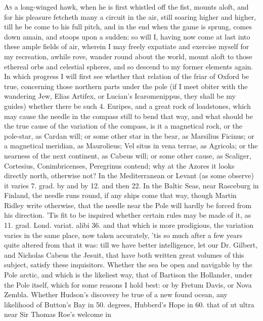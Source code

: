 {\lettrine{A}{s} a long-winged hawk, when he is first whistled off the fist, mounts
aloft, and for his pleasure fetcheth many a circuit in the air, still
soaring higher and higher, till he be come to his full pitch, and in
the end when the game is sprung, comes down amain, and stoops upon a
sudden: so will I, having now come at last into these ample fields of
air, wherein I may freely expatiate and exercise myself for my
recreation, awhile rove, wander round about the world, mount aloft to
those ethereal orbs and celestial spheres, and so descend to my former
elements again. In which progress I will first see whether that
relation of the friar of  Oxford be true, concerning those
northern parts under the pole (if I meet obiter with the wandering Jew,
Elias Artifex, or Lucian's Icaromenippus, they shall be my guides)
whether there be such 4. Euripes, and a great rock of loadstones, which
may cause the needle in the compass still to bend that way, and what
should be the true cause of the variation of the compass, is it a
magnetical rock, or the pole-star, as Cardan will; or some other star
in the bear, as Marsilius Ficinus; or a magnetical meridian, as
Maurolieus; Vel situs in vena terrae, as Agricola; or the nearness of
the next continent, as Cabeus will; or some other cause, as Scaliger,
Cortesius, Conimbricenses, Peregrinus contend; why at the Azores it
looks directly north, otherwise not? In the Mediterranean or Levant (as
some observe) it varies 7. grad. by and by 12. and then 22. In the
Baltic Seas, near Rasceburg in Finland, the needle runs round, if any
ships come that way, though Martin Ridley write otherwise, that
the needle near the Pole will hardly be forced from his direction. 'Tis
fit to be inquired whether certain rules may be made of it, as 11.
grad. Lond. variat. alibi 36. \etc{} and that which is more prodigious,
the variation varies in the same place, now taken accurately, 'tis so
much after a few years quite altered from that it was: till we have
better intelligence, let our Dr. Gilbert, and Nicholas Cabeus the
Jesuit, that have both written great volumes of this subject, satisfy
these inquisitors. Whether the sea be open and navigable by the Pole
arctic, and which is the likeliest way, that of Bartison the Hollander,
under the Pole itself, which for some reasons I hold best: or by Fretum
Davis, or Nova Zembla. Whether Hudson's discovery be true of a
new found ocean, any likelihood of Button's Bay in 50. degrees,
Hubberd's Hope in 60. that of ut ultra near Sir Thomas Roe's welcome in
}
